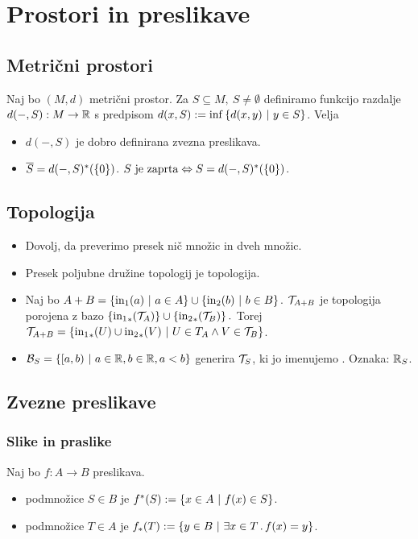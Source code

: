 \section{Prostori in preslikave}
\subsection{Metrični prostori}

Naj bo $(M, d)$ metrični prostor. Za $S \subseteq M, \ S \neq \emptyset$ definiramo funkcijo razdalje $d(-, S): M \to \mathbb{R}$ s predpisom $d(x, S) := \inf \left\{d(x,y) \ | \ y \in S\right\}$. Velja
\begin{itemize}
    \item $d(-, S)$ je dobro definirana zvezna preslikava.
    \item $\overline{S} = d(-, S)^*(\left\{0\right\})$. $S \text{ je zaprta} \Leftrightarrow S = d(-, S)^*(\left\{0\right\})$.
\end{itemize}

\subsection{Topologija}
\begin{itemize}
    \item Dovolj, da preverimo presek nič množic in dveh množic.
    \item Presek poljubne družine topologij je topologija.
    \item Naj bo $A+ B = \left\{\text{in}_1(a) \ | \ a \in A\right\} \cup \left\{\text{in}_2(b) \ | \ b \in B\right\}$. $\mathcal{T}_{A+B}$ je topologija porojena z bazo $\left\{{\text{in}_1}_{*}(\mathcal{T}_A)\right\} \cup \left\{{\text{in}_2}_{*}(\mathcal{T}_B)\right\}.$ Torej $\mathcal{T}_{A+B} = \left\{{\text{in}_1}_{*}(U) \cup {\text{in}_2}_{*}(V) \ | \ U \in T_A \land V \in \mathcal{T}_B\right\}$.
    \item $\mathcal{B}_S = \left\{[a, b) \ | \ a \in \mathbb{R}, b \in \mathbb{R}, a < b\right\}$ generira $\mathcal{T}_S$, ki jo imenujemo . Oznaka: $\mathbb{R}_S$.
\end{itemize}

\subsection{Zvezne preslikave}
\subsubsection{Slike in praslike}
\begin{definicija}
    Naj bo $f: A \to B$ preslikava.
    \begin{itemize}
        \item {} podmnožice $S \in B$ je $f^*(S) := \left\{x \in A \ | \ f(x) \in S\right\}$.
        \item {} podmnožice $T \in A$ je $f_*(T) := \left\{y \in B \ | \ \exists x \in T \,.\, f(x) = y\right\}$.
    \end{itemize}
\end{definicija}


